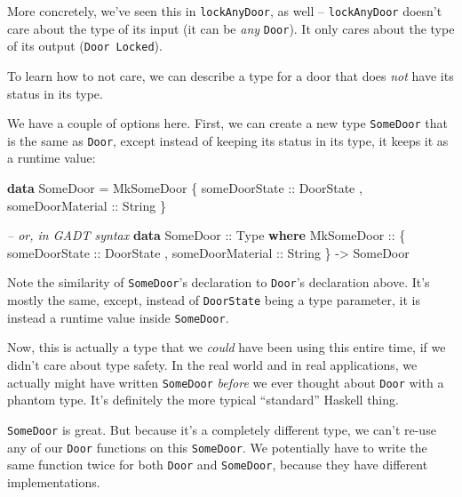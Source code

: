\documentclass[]{article}
\newenvironment{Shaded}{}{}
\newcommand{\KeywordTok}[1]{\textcolor[rgb]{0.00,0.44,0.13}{\textbf{#1}}}
\newcommand{\DataTypeTok}[1]{\textcolor[rgb]{0.56,0.13,0.00}{#1}}
\newcommand{\CommentTok}[1]{\textcolor[rgb]{0.38,0.63,0.69}{\textit{#1}}}
\newcommand{\OtherTok}[1]{\textcolor[rgb]{0.00,0.44,0.13}{#1}}
\newcommand{\FunctionTok}[1]{\textcolor[rgb]{0.02,0.16,0.49}{#1}}
\newcommand{\NormalTok}[1]{#1}
\begin{document}
More concretely, we've seen this in \texttt{lockAnyDoor}, as well --
\texttt{lockAnyDoor} doesn't care about the type of its input (it can be
\emph{any} \texttt{Door}). It only cares about the type of its output
(\texttt{Door\ \textquotesingle{}Locked}).

To learn how to not care, we can describe a type for a door that does \emph{not}
have its status in its type.

We have a couple of options here. First, we can create a new type
\texttt{SomeDoor} that is the same as \texttt{Door}, except instead of keeping
its status in its type, it keeps it as a runtime value:

\begin{Shaded}
\begin{Highlighting}[]
\KeywordTok{data} \DataTypeTok{SomeDoor} \FunctionTok{=} \DataTypeTok{MkSomeDoor}
\NormalTok{    \{}\OtherTok{ someDoorState    ::} \DataTypeTok{DoorState}
\NormalTok{    ,}\OtherTok{ someDoorMaterial ::} \DataTypeTok{String}
\NormalTok{    \}}

\CommentTok{-- or, in GADT syntax}
\KeywordTok{data} \DataTypeTok{SomeDoor}\OtherTok{ ::} \DataTypeTok{Type} \KeywordTok{where}
    \DataTypeTok{MkSomeDoor} \OtherTok{::}
\NormalTok{      \{}\OtherTok{ someDoorState    ::} \DataTypeTok{DoorState}
\NormalTok{      ,}\OtherTok{ someDoorMaterial ::} \DataTypeTok{String}
\NormalTok{      \} }\OtherTok{->} \DataTypeTok{SomeDoor}
\end{Highlighting}
\end{Shaded}

Note the similarity of \texttt{SomeDoor}'s declaration to \texttt{Door}'s
declaration above. It's mostly the same, except, instead of \texttt{DoorState}
being a type parameter, it is instead a runtime value inside \texttt{SomeDoor}.

Now, this is actually a type that we \emph{could} have been using this entire
time, if we didn't care about type safety. In the real world and in real
applications, we actually might have written \texttt{SomeDoor} \emph{before} we
ever thought about \texttt{Door} with a phantom type. It's definitely the more
typical ``standard'' Haskell thing.

\texttt{SomeDoor} is great. But because it's a completely different type, we
can't re-use any of our \texttt{Door} functions on this \texttt{SomeDoor}. We
potentially have to write the same function twice for both \texttt{Door} and
\texttt{SomeDoor}, because they have different implementations.
\end{document}
